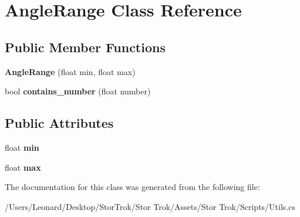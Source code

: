 \hypertarget{class_angle_range}{}\section{Angle\+Range Class Reference}
\label{class_angle_range}
\subsection*{Public Member Functions}
\begin{DoxyCompactItemize}
\item 
\mbox{\label{class_angle_range_a15fbd365c40c3e4d94e084a0b326388d}} 
{\bfseries Angle\+Range} (float min, float max)
\item 
\mbox{\label{class_angle_range_ab52bad939f59a22c7a2a5c3d5ec345fb}} 
bool {\bfseries contains\+\_\+number} (float number)
\end{DoxyCompactItemize}
\subsection*{Public Attributes}
\begin{DoxyCompactItemize}
\item 
\mbox{\label{class_angle_range_a70ae79b50baedb3091d9b6829f4e924d}} 
float {\bfseries min}
\item 
\mbox{\label{class_angle_range_a20b198dd16cd264992dcea5cb6a82fff}} 
float {\bfseries max}
\end{DoxyCompactItemize}


The documentation for this class was generated from the following file\+:\begin{DoxyCompactItemize}
\item 
/\+Users/\+Leonard/\+Desktop/\+Stor\+Trok/\+Stor Trok/\+Assets/\+Stor Trok/\+Scripts/Utils.\+cs\end{DoxyCompactItemize}
